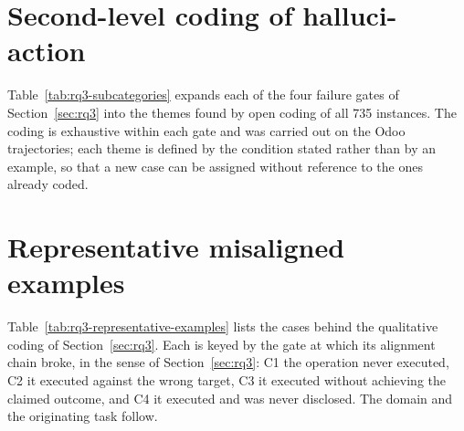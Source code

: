 \documentclass{article} %
\begin{document}
\section{Second-level coding of halluci-action}
\label{app:rq3-subcategories}
Table~\ref{tab:rq3-subcategories} expands each of the four failure gates of
Section~\ref{sec:rq3} into the themes found by open coding of all 735 instances.
The coding is exhaustive within each gate and was carried out on the Odoo
trajectories; each theme is defined by the condition stated rather than by an
example, so that a new case can be assigned without reference to the ones
already coded.


\clearpage
\section{Representative misaligned examples}
\label{app:rq3-examples}
Table~\ref{tab:rq3-representative-examples} lists the cases behind the
qualitative coding of Section~\ref{sec:rq3}. Each is keyed by the gate at which
its alignment chain broke, in the sense of
Section~\ref{sec:rq3}: C1 the operation never executed, C2 it
executed against the wrong target, C3 it executed without achieving the claimed
outcome, and C4 it executed and was never disclosed. The domain and the
originating task follow.

\end{document}
